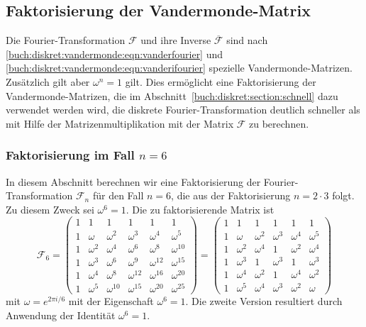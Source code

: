 %
%

%
%
%
\subsection{Faktorisierung der Vandermonde-Matrix
\label{buch:diskret:subsetion:faktorisierung}}
Die Fourier-Transformation $\mathscr{F}$ und ihre Inverse
$\overline{\mathscr{F}}$ sind nach
\eqref{buch:diskret:vandermonde:eqn:vanderfourier}
und
\eqref{buch:diskret:vandermonde:eqn:vanderifourier}
spezielle Vandermonde-Matrizen.
Zusätzlich gilt aber $\omega^n=1$ gilt.
Dies ermöglicht eine Faktorisierung der Vandermonde-Matrizen, die
im Abschnitt~\ref{buch:diskret:section:schnell} dazu verwendet
werden wird, die diskrete Fourier-Transformation deutlich schneller
als mit Hilfe der Matrizenmultiplikation mit der Matrix $\mathscr{F}$
zu berechnen.

%
%
\subsubsection{Faktorisierung im Fall $n=6$}
In diesem Abschnitt berechnen wir eine Faktorisierung der
Fourier-Transformation $\mathscr{F}_n$ für den Fall $n=6$,
die aus der Faktorisierung $n=2\cdot 3$ folgt.
Zu diesem Zweck sei $\omega^6=1$.
Die zu faktorisierende Matrix ist
\[
\mathscr{F}_6
=
\begin{pmatrix}
1&       1&          1&          1&          1&          1\\
1&  \omega&   \omega^2&   \omega^3&   \omega^4&   \omega^5\\
1&\omega^2&   \omega^4&   \omega^6&   \omega^8&\omega^{10}\\
1&\omega^3&   \omega^6&   \omega^9&\omega^{12}&\omega^{15}\\
1&\omega^4&   \omega^8&\omega^{12}&\omega^{16}&\omega^{20}\\
1&\omega^5&\omega^{10}&\omega^{15}&\omega^{20}&\omega^{25}
\end{pmatrix}
=
\begin{pmatrix}
1&       1&       1&       1&       1&       1\\
1&  \omega&\omega^2&\omega^3&\omega^4&\omega^5\\
1&\omega^2&\omega^4&       1&\omega^2&\omega^4\\
1&\omega^3&       1&\omega^3&       1&\omega^3\\
1&\omega^4&\omega^2&       1&\omega^4&\omega^2\\
1&\omega^5&\omega^4&\omega^3&\omega^2&\omega
\end{pmatrix}
\]
mit $\omega = e^{2\pi i/6}$ mit der Eigenschaft $\omega^6=1$.
Die zweite Version resultiert durch Anwendung der Identität $\omega^6=1$.

